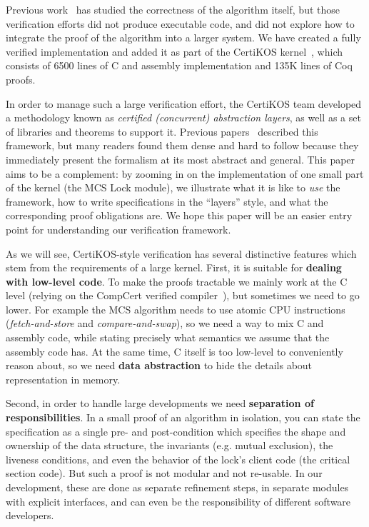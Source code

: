 {Previous work~\cite{liang:lili,ogata:mcs-lock} has studied the
correctness of the algorithm itself, but those verification efforts
did not produce executable code, and did not explore how to integrate
the proof of the algorithm into a larger system. We have created a
fully verified implementation and added it as part of the CertiKOS
kernel~\cite{certikos16}, which consists of 6500 lines of C and
assembly implementation and 135K lines of Coq proofs.

In order to manage such a large verification effort, the CertiKOS team developed a methodology known as \emph{certified (concurrent) abstraction layers}, as well as a set of libraries and theorems to support it. Previous papers~\cite{dscal15,ccal16}
described this framework, but many readers found them  dense and hard to follow because they immediately present the formalism at its most abstract and general.
This paper aims to be a complement: by zooming in on the implementation of one small part of the kernel (the MCS Lock module), we illustrate  what it is like to \emph{use} the framework, how to write specifications in the ``layers'' style, and what the corresponding proof obligations are. We hope this paper will be an easier entry point for understanding our verification framework.

As we will see, CertiKOS-style verification has several distinctive features which stem from the requirements of a large kernel. First, it is suitable for {\bf dealing with low-level code}. To make the proofs tractable we mainly work at the C level (relying on the CompCert verified compiler~\cite{Leroy-Compcert-CACM}), but sometimes we need to go lower. For example the MCS algorithm needs to use atomic CPU instructions ({\em fetch-and-store} and {\em compare-and-swap}), so we need a way to  mix C and assembly code, while stating precisely what semantics we assume that the assembly code has. At the same time, C itself is too low-level to conveniently reason about, so we need {\bf data abstraction} to hide the details about representation in memory.

Second, in order to handle large developments we need {\bf separation of responsibilities}. In a small proof of an algorithm in isolation, you can state the specification as a single pre- and post-condition which specifies the shape and ownership of the data structure, the invariants (e.g. mutual exclusion), the liveness conditions, and even the behavior of the lock's client code (the critical section code). But such a proof is not modular and not re-usable. In our development, these are done as separate refinement steps, in separate modules with explicit interfaces, and can even be the responsibility of different software developers. 

}

